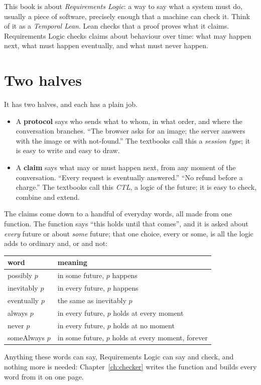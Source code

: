 \documentclass[11pt,oneside]{book}
\theoremstyle{remark}
\begin{document}
This book is about \emph{Requirements Logic}: a way to say what a system must do, usually a
piece of software, precisely enough that a machine can check it. Think of it as a
\emph{Temporal Lean}. Lean checks that a proof proves what it claims. Requirements Logic
checks claims about behaviour over time: what may happen next, what must happen eventually,
and what must never happen.

\section*{Two halves}

It has two halves, and each has a plain job.
\begin{itemize}
\item A \textbf{protocol} says who sends what to whom, in what order, and where the
  conversation branches. ``The browser asks for an image; the server answers with the image
  or with not-found.'' The textbooks call this a \emph{session type}; it is easy to write and
  easy to draw.
\item A \textbf{claim} says what may or must happen next, from any moment of the
  conversation. ``Every request is eventually answered.'' ``No refund before a charge.''
  The textbooks call this \emph{CTL}, a logic of the future; it is easy to check, combine
  and extend.
\end{itemize}
The claims come down to a handful of everyday words, all made from one function. The
function says ``this holds until that comes'', and it is asked about \emph{every} future or
about \emph{some} future; that one choice, every or some, is all the logic adds to ordinary
and, or and not:
\begin{center}
\begin{tabular}{@{}ll@{}}
\toprule
word & meaning \\
\midrule
\textsf{possibly} $p$ & in some future, $p$ happens \\
\textsf{inevitably} $p$ & in every future, $p$ happens \\
\textsf{eventually} $p$ & the same as \textsf{inevitably} $p$ \\
\textsf{always} $p$ & in every future, $p$ holds at every moment \\
\textsf{never} $p$ & in every future, $p$ holds at no moment \\
\textsf{someAlways} $p$ & in some future, $p$ holds at every moment, forever \\
\bottomrule
\end{tabular}
\end{center}
Anything these words can say, Requirements Logic can say and check, and nothing more is
needed: Chapter~\ref{ch:checker} writes the function and builds every word from it on one
page.
\end{document}
